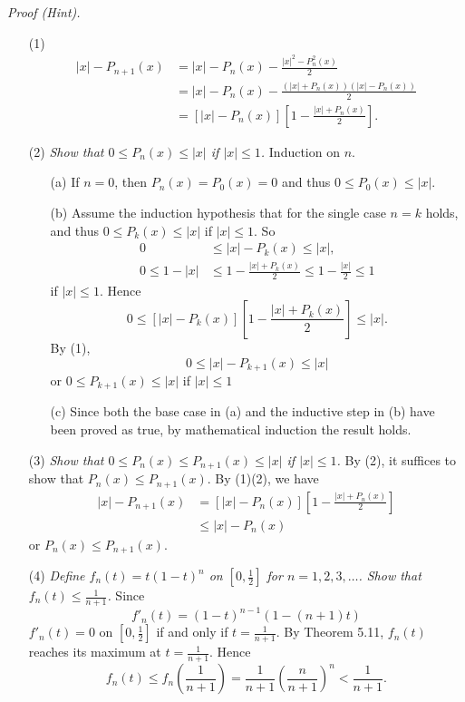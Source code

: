 \documentclass{article}
\begin{document}
\emph{Proof (Hint).}
\begin{enumerate}
\item[(1)]
\begin{align*}
  |x| - P_{n+1}(x)
  &= |x| - P_n(x) - \frac{|x|^2 - P_n^2(x)}{2} \\
  &= |x| - P_n(x) - \frac{(|x| + P_n(x))(|x| - P_n(x))}{2} \\
  &= [|x| - P_n(x)]\left[1-\frac{|x|+P_n(x)}{2}\right].
\end{align*}

\item[(2)]
\emph{Show that $0 \leq P_n(x) \leq |x|$ if $|x| \leq 1$.}
Induction on $n$.
  \begin{enumerate}
  \item[(a)]
  If $n = 0$, then $P_n(x) = P_0(x) = 0$ and thus $0 \leq P_0(x) \leq |x|$.

  \item[(b)]
  Assume the induction hypothesis that for the single case $n = k$ holds,
  and thus $0 \leq P_k(x) \leq |x|$ if $|x| \leq 1$.
  So
  \begin{align*}
    0 &\leq |x|-P_k(x) \leq |x|, \\
    0 \leq 1-|x| &\leq 1-\frac{|x|+P_k(x)}{2} \leq 1-\frac{|x|}{2} \leq 1
  \end{align*}
  if $|x| \leq 1$.
  Hence
  \[
    0 \leq [|x| - P_k(x)]\left[1-\frac{|x|+P_k(x)}{2}\right] \leq |x|.
  \]
  By (1),
  \[
    0 \leq |x| - P_{k+1}(x) \leq |x|
  \]
  or $0 \leq P_{k+1}(x) \leq |x|$ if $|x| \leq 1$

  \item[(c)]
  Since both the base case in (a) and
  the inductive step in (b) have been proved as true,
  by mathematical induction the result holds.
  \end{enumerate}

\item[(3)]
\emph{Show that $0 \leq P_n(x) \leq P_{n+1}(x) \leq |x|$ if $|x| \leq 1$.}
By (2), it suffices to show that $P_{n}(x) \leq P_{n+1}(x)$.
By (1)(2), we have
\begin{align*}
  |x| - P_{n+1}(x)
  &= [|x| - P_n(x)]\left[1-\frac{|x|+P_n(x)}{2}\right] \\
  &\leq |x| - P_n(x)
\end{align*}
or $P_{n}(x) \leq P_{n+1}(x)$.

\item[(4)]
\emph{Define $f_n(t) = t(1-t)^n$ on $\left[0,\frac{1}{2}\right]$ for $n=1,2,3,\ldots$.
Show that $f_n(t) \leq \frac{1}{n+1}$.}
Since
\[
  f'_n(t) = (1-t)^{n-1}(1 - (n+1)t)
\]
$f'_n(t) = 0$ on $\left[0,\frac{1}{2}\right]$ if and only if $t = \frac{1}{n+1}$.
By Theorem 5.11, $f_n(t)$ reaches its maximum at $t = \frac{1}{n+1}$.
Hence
\[
  f_n(t)
  \leq f_n\left(\frac{1}{n+1}\right)
  = \frac{1}{n+1} \left(\frac{n}{n+1}\right)^n
  < \frac{1}{n+1}.
\]


\end{enumerate}
\end{document}
